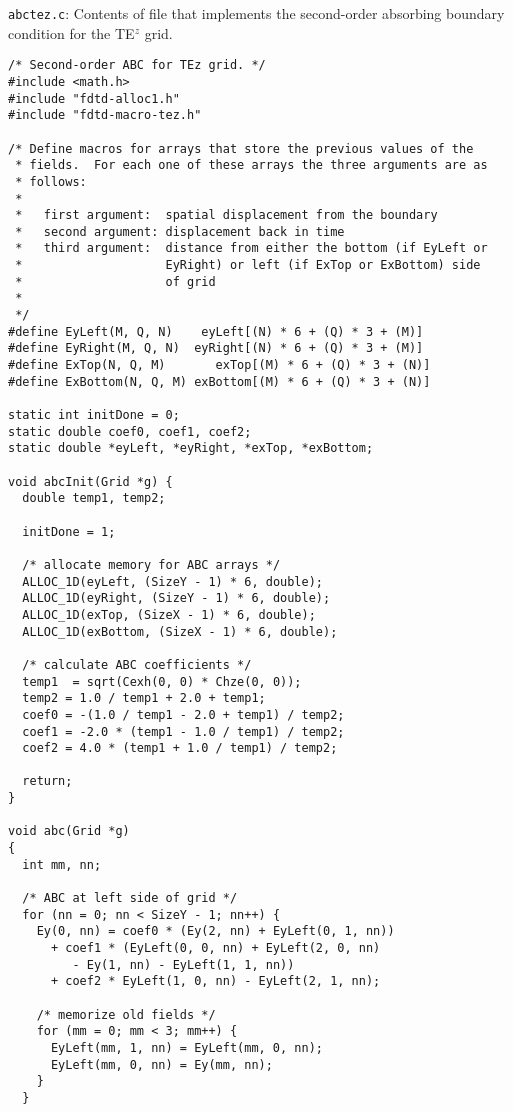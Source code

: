 \begin{program}
{\tt abctez.c}: Contents of file that implements the second-order
absorbing boundary condition for the TE$^z$ grid.
\label{pro:abctez}
\codemiddle
\begin{lstlisting}
/* Second-order ABC for TEz grid. */
#include <math.h>
#include "fdtd-alloc1.h"
#include "fdtd-macro-tez.h"

/* Define macros for arrays that store the previous values of the
 * fields.  For each one of these arrays the three arguments are as
 * follows:
 *
 *   first argument:  spatial displacement from the boundary
 *   second argument: displacement back in time
 *   third argument:  distance from either the bottom (if EyLeft or
 *                    EyRight) or left (if ExTop or ExBottom) side
 *                    of grid
 *                    
 */
#define EyLeft(M, Q, N)    eyLeft[(N) * 6 + (Q) * 3 + (M)]
#define EyRight(M, Q, N)  eyRight[(N) * 6 + (Q) * 3 + (M)]
#define ExTop(N, Q, M)       exTop[(M) * 6 + (Q) * 3 + (N)]
#define ExBottom(N, Q, M) exBottom[(M) * 6 + (Q) * 3 + (N)]

static int initDone = 0;
static double coef0, coef1, coef2;
static double *eyLeft, *eyRight, *exTop, *exBottom;

void abcInit(Grid *g) {
  double temp1, temp2;
  
  initDone = 1;

  /* allocate memory for ABC arrays */
  ALLOC_1D(eyLeft, (SizeY - 1) * 6, double);
  ALLOC_1D(eyRight, (SizeY - 1) * 6, double);
  ALLOC_1D(exTop, (SizeX - 1) * 6, double);
  ALLOC_1D(exBottom, (SizeX - 1) * 6, double);

  /* calculate ABC coefficients */
  temp1  = sqrt(Cexh(0, 0) * Chze(0, 0));
  temp2 = 1.0 / temp1 + 2.0 + temp1;
  coef0 = -(1.0 / temp1 - 2.0 + temp1) / temp2;
  coef1 = -2.0 * (temp1 - 1.0 / temp1) / temp2;
  coef2 = 4.0 * (temp1 + 1.0 / temp1) / temp2;

  return;
} 

void abc(Grid *g)
{
  int mm, nn;

  /* ABC at left side of grid */
  for (nn = 0; nn < SizeY - 1; nn++) {
    Ey(0, nn) = coef0 * (Ey(2, nn) + EyLeft(0, 1, nn))
      + coef1 * (EyLeft(0, 0, nn) + EyLeft(2, 0, nn)
		 - Ey(1, nn) - EyLeft(1, 1, nn))
      + coef2 * EyLeft(1, 0, nn) - EyLeft(2, 1, nn);

    /* memorize old fields */ 
    for (mm = 0; mm < 3; mm++) {
      EyLeft(mm, 1, nn) = EyLeft(mm, 0, nn);
      EyLeft(mm, 0, nn) = Ey(mm, nn);
    }
  }
  

\end{lstlisting}
\end{program}
